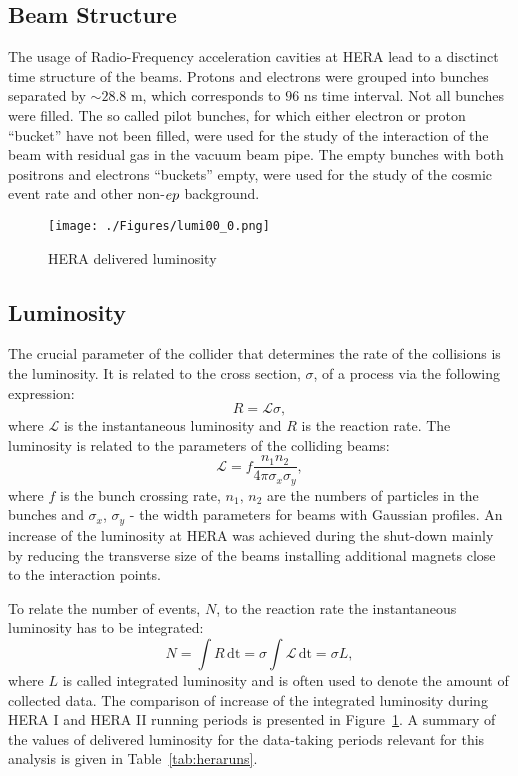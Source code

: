 \subsection{Beam Structure}
\label{subsec:beamstruct}
The usage of Radio-Frequency acceleration cavities at HERA lead to a disctinct time structure of the beams. Protons and electrons were grouped into bunches separated by $\sim 28.8$ m, which corresponds to $96$ ns time interval. Not all bunches were filled. The so called pilot bunches, for which either electron or proton ``bucket'' have not been filled, were used for the study of the interaction of the beam with residual gas in the vacuum beam pipe. The empty bunches with both positrons and electrons ``buckets'' empty, were used for the study of the cosmic event rate and other non-$\mbox{$e p$}$ background.

\begin{figure}[t]
	\centering
		\texttt{[image: ./Figures/lumi00\_0.png]}
	\caption{HERA delivered luminosity}
	\label{fig:lumi00_0}
\end{figure}

\subsection{Luminosity}
\label{subsec:luminosity}
The crucial parameter of the collider that determines the rate of the collisions is the luminosity. It is related to the cross section, $\sigma$, of a process via the following expression:
\begin{equation}
	R = \mathcal{L}\sigma,
\end{equation}
where $\mathcal{L}$ is the instantaneous luminosity and $R$ is the reaction rate. The luminosity is related to the parameters of the colliding beams:
\begin{equation}
	\mathcal{L} = f\frac{n_1n_2}{4\pi\sigma_x\sigma_y},
\end{equation}
where $f$ is the bunch crossing rate, $n_1,\,n_2$ are the numbers of particles in the bunches and $\sigma_x$, $\sigma_y$ - the width parameters for beams with Gaussian profiles. An increase of the luminosity at HERA was achieved during the shut-down mainly by reducing the transverse size of the beams installing additional magnets close to the interaction points. 

To relate the number of events, $N$, to the reaction rate the instantaneous luminosity has to be integrated:
\begin{equation}
	N = \int{R\,\mathrm{dt}} = \sigma\int{\mathcal{L}\,\mathrm{dt}} = \sigma L,
\end{equation}
where $L$ is called integrated luminosity and is often used to denote the amount of collected data. The comparison of increase of the integrated luminosity during HERA I and HERA II running periods is presented in Figure~\ref{fig:lumi00_0}. A summary of the values of delivered luminosity for the data-taking periods relevant for this analysis is given in Table~\ref{tab:heraruns}.

